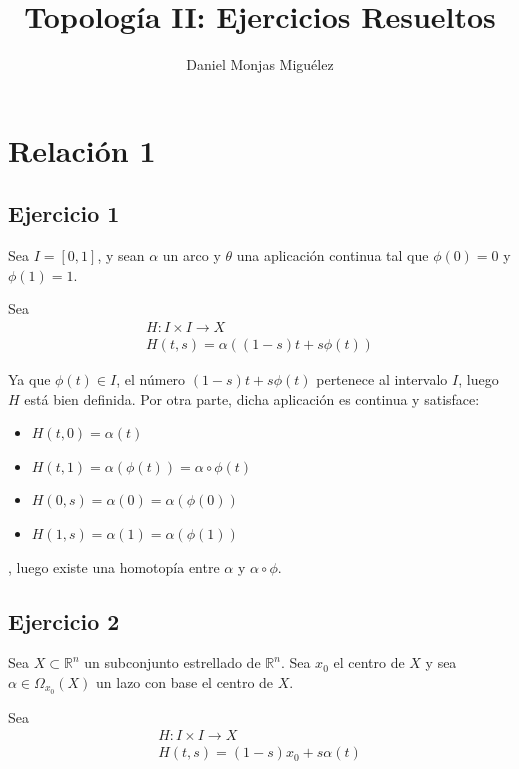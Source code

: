 \documentclass{article}
\author{Daniel Monjas Miguélez}
\title{Topología II: Ejercicios Resueltos}
\begin{document}
\maketitle

\newpage

\tableofcontents

\newpage

\section{Relación 1}
\subsection{Ejercicio 1}
Sea $I=[0,1]$, y sean $\alpha$ un arco y $\theta$ una aplicación continua tal que $\phi(0)=0$ y $\phi(1)=1$.

Sea 
\begin{equation*}
\left.\begin{array}{c}
H:I\times I\rightarrow X\\
H(t,s)=\alpha((1-s)t+s\phi(t))
\end{array} \right.
\end{equation*}

Ya que $\phi(t)\in I$, el número $(1-s)t+s\phi(t)$ pertenece al intervalo $I$, luego $H$ está bien definida. Por otra parte, dicha aplicación es continua y satisface:
\begin{itemize}
\item $H(t,0)=\alpha(t)$
\item $H(t,1)=\alpha(\phi(t))=\alpha\circ\phi(t)$
\item $H(0,s)=\alpha(0)=\alpha(\phi(0))$
\item $H(1,s)=\alpha(1)=\alpha(\phi(1))$ 
\end{itemize}

, luego existe una homotopía entre $\alpha$ y $\alpha\circ \phi$.

\subsection{Ejercicio 2}
Sea $X\subset \mathbb{R}^n$ un subconjunto estrellado de $\mathbb{R}^n$. Sea $x_0$ el centro de $X$ y sea $\alpha\in\Omega_{x_0}(X)$ un lazo con base el centro de $X$. 

Sea
\begin{equation*}
\left.\begin{array}{c}
H:I\times I\rightarrow X \\
H(t,s)=(1-s)x_0+s\alpha(t)
\end{array}\right.
\end{equation*}
\end{document}
